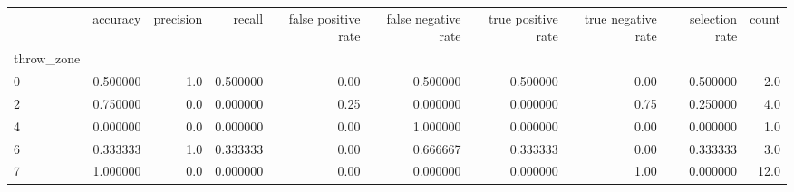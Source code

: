 \begin{tabular}{lrrrrrrrrr}
\toprule
{} &  accuracy &  precision &    recall &  false positive rate &  false negative rate &  true positive rate &  true negative rate &  selection rate &  count \\
throw\_zone &           &            &           &                      &                      &                     &                     &                 &        \\
\midrule
0          &  0.500000 &        1.0 &  0.500000 &                 0.00 &             0.500000 &            0.500000 &                0.00 &        0.500000 &    2.0 \\
2          &  0.750000 &        0.0 &  0.000000 &                 0.25 &             0.000000 &            0.000000 &                0.75 &        0.250000 &    4.0 \\
4          &  0.000000 &        0.0 &  0.000000 &                 0.00 &             1.000000 &            0.000000 &                0.00 &        0.000000 &    1.0 \\
6          &  0.333333 &        1.0 &  0.333333 &                 0.00 &             0.666667 &            0.333333 &                0.00 &        0.333333 &    3.0 \\
7          &  1.000000 &        0.0 &  0.000000 &                 0.00 &             0.000000 &            0.000000 &                1.00 &        0.000000 &   12.0 \\
\bottomrule
\end{tabular}
